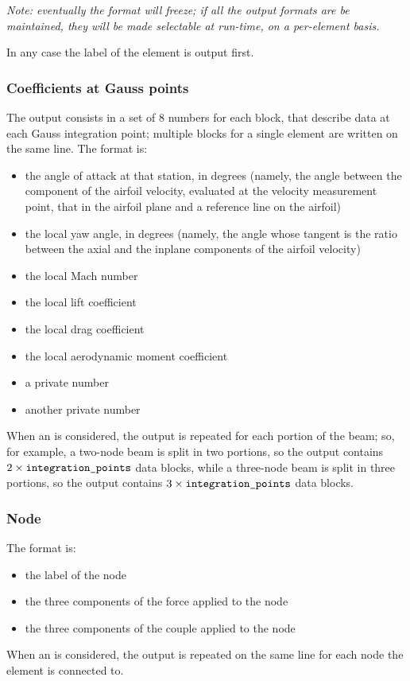 \noindent
\emph{Note: eventually the format will freeze; if all the output formats
are be maintained, they will be made selectable at run-time,
on a per-element basis.}

\noindent
In any case the label of the element is output first.

\subsubsection{Coefficients at Gauss points}
The output consists in a set of 8 numbers for each block,
that describe data at each Gauss integration point;
multiple blocks for a single element are written on the same line.
The format is:
\begin{itemize}
    \item the angle of attack at that station, in degrees 
	(namely, the angle between the component of the airfoil velocity,
	evaluated at the velocity measurement point, that in the airfoil
	plane and a reference line on the airfoil)
    \item the local yaw angle, in degrees
	(namely, the angle whose tangent is the ratio
	between the axial and the inplane components of the airfoil
	velocity)
    \item the local Mach number
    \item the local lift coefficient
    \item the local drag coefficient
    \item the local aerodynamic moment coefficient
    \item a private number
    \item another private number
\end{itemize}
When an  is considered, the output 
is repeated for each portion of the beam; so, for example,
a two-node beam is split in two portions, so the output
contains $2\times \texttt{integration\_points}$ data blocks,
while a three-node beam is split in three portions,
so the output contains $3\times \texttt{integration\_points}$ data blocks.

\subsubsection{Node}
The format is:
\begin{itemize}
    \item the label of the node
    \item the three components of the force applied to the node
    \item the three components of the couple applied to the node
\end{itemize}
When an  is considered, the output is repeated 
on the same line for each node the element is connected to.

